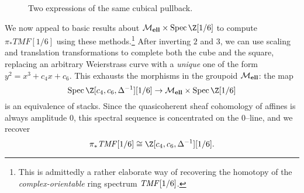 \begin{figure}
    \begin{center}
     \hspace{1em}
    \end{center}
    \caption{Two expressions of the same cubical pullback.}\label{HypercubesFigure}
\end{figure}

\begin{example}
We now appeal to basic results about $\moduli{ell} \times \Spec \Z[1/6]$ to compute $\pi_* TMF[1/6]$ using these methods.\footnote{This is admittedly a rather elaborate way of recovering the homotopy of the \emph{complex-orientable} ring spectrum $\mathit{TMF}[1/6]$.}  After inverting $2$ and $3$, we can use scaling and translation transformations to complete both the cube and the square, replacing an arbitrary Weierstrass curve with a \emph{unique} one of the form $y^2 = x^3 + c_4 x + c_6$.  This exhausts the morphisms in the groupoid $\mathcal{M}_{\mathbf{ell}}$: the map \[\Spec \Z[c_4, c_6, \Delta^{-1}][1/6] \to \moduli{ell} \times \Spec \Z[1/6]\] is an equivalence of stacks.  Since the quasicoherent sheaf cohomology of affines is always amplitude $0$, this spectral sequence is concentrated on the $0$--line, and we recover \[\pi_* \TMF[1/6] \cong \Z[c_4, c_6, \Delta^{-1}][1/6].\]
\end{example}




















